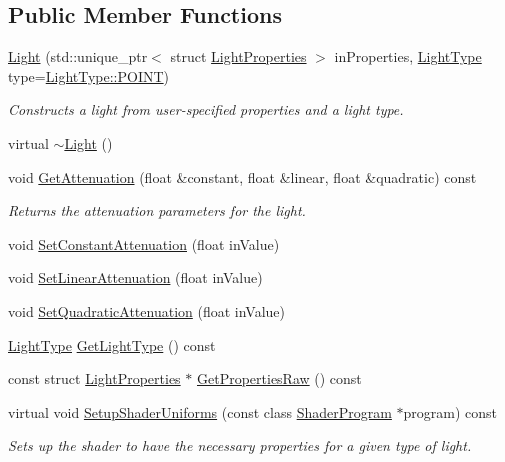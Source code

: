 \subsection*{Public Member Functions}
\begin{DoxyCompactItemize}
\item 
\hyperlink{class_light_adca12f0d5470bc3f2e6e77233ab3dcf1}{Light} (std\+::unique\+\_\+ptr$<$ struct \hyperlink{struct_light_properties}{Light\+Properties} $>$ in\+Properties, \hyperlink{class_light_a661d9480e01af8b1612860b9630ef5f8}{Light\+Type} type=\hyperlink{class_light_a661d9480e01af8b1612860b9630ef5f8aaebdbcb765394d25d6a604589a890f82}{Light\+Type\+::\+P\+O\+I\+NT})
\begin{DoxyCompactList}\small\item\em Constructs a light from user-\/specified properties and a light type. \end{DoxyCompactList}\item 
virtual \hyperlink{class_light_ad0e59fad13bb6cfadc25b2c477e9ddc7}{$\sim$\+Light} ()
\item 
void \hyperlink{class_light_acd1a8b84fbcc1ef2dc8b3bc5ecf76c7b}{Get\+Attenuation} (float \&constant, float \&linear, float \&quadratic) const
\begin{DoxyCompactList}\small\item\em Returns the attenuation parameters for the light. \end{DoxyCompactList}\item 
void \hyperlink{class_light_aec7f3864e328bc9fada51fdb3e8a7c8e}{Set\+Constant\+Attenuation} (float in\+Value)
\item 
void \hyperlink{class_light_aa33086ed4bff3ac95c700698b3070108}{Set\+Linear\+Attenuation} (float in\+Value)
\item 
void \hyperlink{class_light_a413e0445d66742c666114dd74d689fc6}{Set\+Quadratic\+Attenuation} (float in\+Value)
\item 
\hyperlink{class_light_a661d9480e01af8b1612860b9630ef5f8}{Light\+Type} \hyperlink{class_light_aaa0ba2164adcab55ed7bc1f957fa1f75}{Get\+Light\+Type} () const
\item 
const struct \hyperlink{struct_light_properties}{Light\+Properties} $\ast$ \hyperlink{class_light_a1d2283dacdef30df671d55b7dc415851}{Get\+Properties\+Raw} () const
\item 
virtual void \hyperlink{class_light_adb3750e44ae24fefa1f4c89f933b2677}{Setup\+Shader\+Uniforms} (const class \hyperlink{class_shader_program}{Shader\+Program} $\ast$program) const
\begin{DoxyCompactList}\small\item\em Sets up the shader to have the necessary properties for a given type of light. \end{DoxyCompactList}\end{DoxyCompactItemize}
